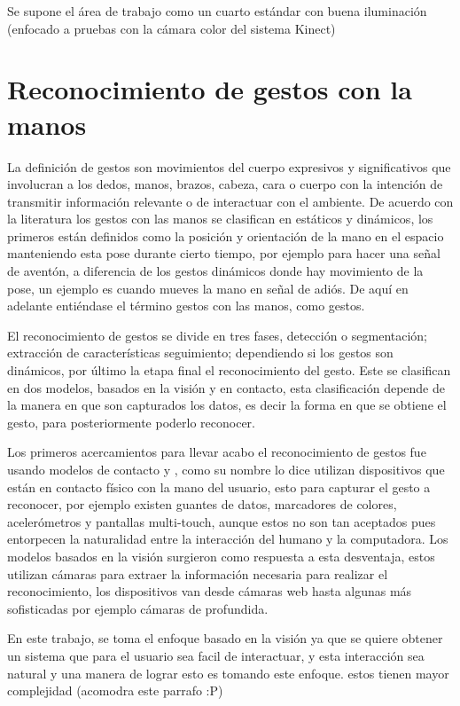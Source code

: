 Se supone el área de trabajo como un cuarto estándar con buena iluminación (enfocado a pruebas con la cámara color del sistema Kinect)

\section{Reconocimiento de gestos con la manos}\label{sec:ReconocimientoGestos} 


La definición de gestos \citep{Mitra2007} son movimientos del cuerpo expresivos y significativos que involucran a los dedos, manos, brazos, cabeza, cara o cuerpo con la intención de transmitir información relevante o de interactuar con el ambiente. De acuerdo con la literatura \citep{Mitra2007} los gestos con las manos se clasifican en estáticos y dinámicos, los primeros están definidos como la posición y orientación de la mano en el espacio manteniendo esta pose durante cierto tiempo, por ejemplo para hacer una se\~nal de aventón, a diferencia de los gestos dinámicos donde hay movimiento de la pose, un ejemplo  es cuando mueves la mano en se\~nal de adiós. De aquí en adelante entiéndase el término gestos con las manos, como gestos. 

El reconocimiento de gestos se divide en tres fases\cite{Rautaray2012}, detección o segmentación; extracci\'on de caracter\'isticas seguimiento; dependiendo si los gestos son dinámicos, por último la etapa final el reconocimiento del gesto.  
Este se clasifican en dos modelos, basados en la visi\'on y en contacto, esta clasificaci\'on depende de la manera en que son capturados los datos, es decir la forma en que se obtiene el gesto, para posteriormente poderlo reconocer. 

Los primeros acercamientos para llevar acabo el reconocimiento de gestos fue usando modelos de contacto \cite{Rautaray2012} y \cite{Nayakwadi2014}, como su nombre lo dice utilizan dispositivos que est\'an en contacto f\'isico con la mano del usuario, esto para capturar el gesto a reconocer, por ejemplo existen guantes de datos, marcadores de colores, acelerómetros y pantallas multi-touch, aunque estos no son tan aceptados pues entorpecen la naturalidad entre la interacción del humano y la computadora. Los modelos basados en la visi\'on surgieron como respuesta a esta desventaja, estos utilizan cámaras para extraer la información necesaria para realizar el reconocimiento, los dispositivos van desde c\'amaras web hasta algunas más sofisticadas por ejemplo c\'amaras de profundida.  

En este trabajo, se toma el enfoque basado en la visi\'on ya que se quiere obtener un sistema que para el usuario sea facil de interactuar, y esta interacci\'on sea natural y una manera de lograr esto es tomando este enfoque.  estos tienen mayor complejidad (acomodra este parrafo :P)


